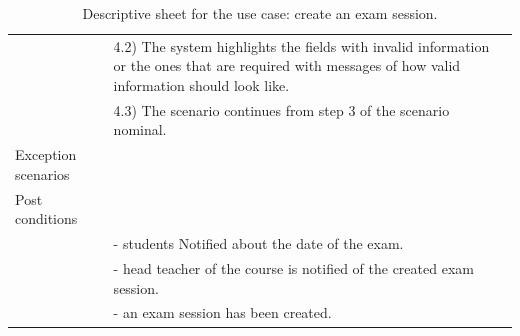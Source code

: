 \documentclass[]{uc2pfecaneva}
\begin{document}
\begin{table}[t]
\begin{tabularx}{\textwidth}{|l|X|}
            & \hspace{4mm}4.2) The system highlights the fields with invalid information or the ones that are required with messages of how valid information should look like. \\
            & \hspace{4mm}4.3) The scenario continues from step 3 of the scenario nominal.                                                                                      \\ \hline
            Exception scenarios   &                                                                                                                                                                   \\ \hline
            Post conditions       &                                                                                                                                                                   \\
            & - students Notified about the date of the exam.                                                                                                                   \\
            & - head teacher of the course is notified of the created exam session.                                                                                             \\
            & - an exam session has been created.                                                                                                                               \\ \hline
        \end{tabularx}
        \caption{Descriptive sheet for the use case: create an exam session.}
        \label{table:2}
    \end{table}
    \clearpage
\end{document}

